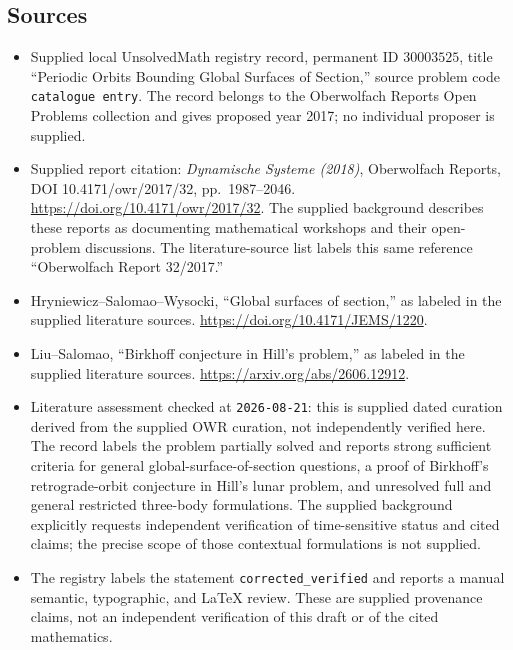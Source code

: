 \documentclass[11pt]{article}
\begin{document}
\subsection{Sources}
\begin{itemize}
\item Supplied local UnsolvedMath registry record, permanent ID \(30003525\), title ``Periodic Orbits Bounding Global Surfaces of Section,'' source problem code \texttt{catalogue entry}. The record belongs to the Oberwolfach Reports Open Problems collection and gives proposed year 2017; no individual proposer is supplied.
\item Supplied report citation: \emph{Dynamische Systeme (2018)}, Oberwolfach Reports, DOI 10.4171/owr/2017/32, pp.\ 1987--2046. \url{https://doi.org/10.4171/owr/2017/32}. The supplied background describes these reports as documenting mathematical workshops and their open-problem discussions. The literature-source list labels this same reference ``Oberwolfach Report 32/2017.''
\item Hryniewicz--Salomao--Wysocki, ``Global surfaces of section,'' as labeled in the supplied literature sources. \url{https://doi.org/10.4171/JEMS/1220}.
\item Liu--Salomao, ``Birkhoff conjecture in Hill's problem,'' as labeled in the supplied literature sources. \url{https://arxiv.org/abs/2606.12912}.
\item Literature assessment checked at \texttt{2026-08-21}: this is supplied dated curation derived from the supplied OWR curation, not independently verified here. The record labels the problem partially solved and reports strong sufficient criteria for general global-surface-of-section questions, a proof of Birkhoff's retrograde-orbit conjecture in Hill's lunar problem, and unresolved full and general restricted three-body formulations. The supplied background explicitly requests independent verification of time-sensitive status and cited claims; the precise scope of those contextual formulations is not supplied.
\item The registry labels the statement \texttt{corrected\_verified} and reports a manual semantic, typographic, and LaTeX review. These are supplied provenance claims, not an independent verification of this draft or of the cited mathematics.
\end{itemize}
\end{document}
